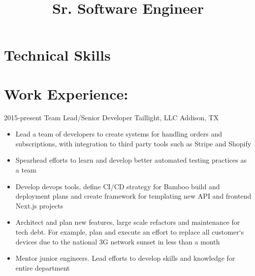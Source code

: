 \documentclass{moderncv}
\title{Sr. Software Engineer}
\begin{document}
    	
	\makecvtitle
	
	\section{Technical Skills}
	
	\section{Work Experience:}
	
	\cventry
	{2015-present}
	{Team Lead/Senior Developer}   
	{Taillight, LLC}
	{Addison, TX}{}
	{
		\begin{itemize}
			\item {Lead a team of developers to create systems for handling orders and subscriptions, with integration to third party tools such as Stripe and Shopify}
			\item {Spearhead efforts to learn and develop better automated testing practices as a team}
			\item {Develop devops tools, define CI/CD strategy for Bamboo build and deployment plans and create framework for templating new API and frontend Next.js projects}
			\item {Architect and plan new features, large scale refactors and maintenance for tech debt. For example, plan and execute an effort to replace all customer`s devices due to the national 3G network sunset in less than a month}
			\item {Mentor junior engineers. Lead efforts to develop skills and knowledge for entire department}
		\end{itemize}
	}
	
\end{document}
